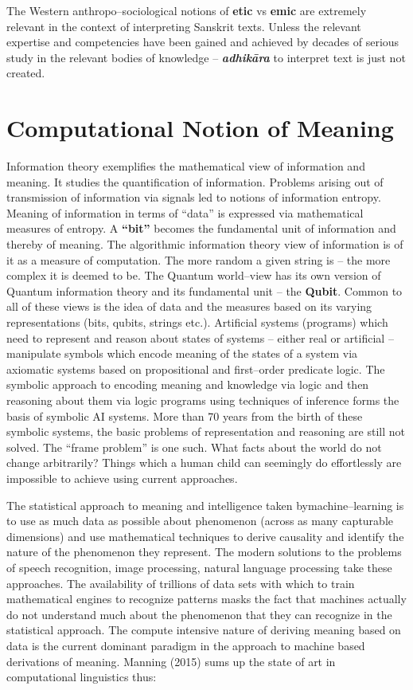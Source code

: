 The Western anthropo–sociological notions of \textbf{etic} vs \textbf{emic} are extremely relevant in the context of interpreting Sanskrit texts. Unless the relevant expertise and competencies have been gained and achieved by decades of serious study in the relevant bodies of knowledge – \textbf{\textit{adhikāra}} to interpret text is just not created.


\section*{Computational Notion of Meaning}

\vskip -6.5pt

Information theory exemplifies the mathematical view of information and meaning. It studies the quantification of information. Problems arising out of transmission of information via signals led to notions of information entropy. Meaning of information in terms of “data” is expressed via mathematical measures of entropy. A \textbf{“bit”} becomes the fundamental unit of information and thereby of meaning. The algorithmic information theory view of information is of it as a measure of computation. The more random a given string is – the more complex it is deemed to be. The Quantum world–view has its own version of Quantum information theory and its fundamental unit – the \textbf{Qubit}. Common to all of these views is the idea of data and the measures based on its varying representations (bits, qubits, strings etc.). Artificial systems (programs) which need to represent and reason about states of systems – either real or artificial – manipulate symbols which encode meaning of the states of a system via axiomatic systems based on propositional and first–order predicate logic. The symbolic approach to encoding meaning and knowledge via logic and then reasoning about them via logic programs using techniques of inference forms the basis of symbolic AI systems. More than 70 years from the birth of these symbolic systems, the basic problems of representation and reasoning are still not solved. The “frame problem” is one such. What facts about the world do not change arbitrarily? Things which a human child can seemingly do effortlessly are impossible to achieve using current approaches.

The statistical approach to meaning and intelligence taken by\break machine–learning is to use as much data as possible about phenomenon (across as many capturable dimensions) and use mathematical techniques to derive causality and identify the nature of the phenomenon they represent. The modern solutions to the problems of speech recognition, image processing, natural language processing take these approaches. The availability of trillions of data sets with which to train mathematical engines to recognize patterns masks the fact that machines actually do not understand much about the phenomenon that they can recognize in the statistical approach. The compute intensive nature of deriving meaning based on data is the current dominant paradigm in the approach to machine based derivations of meaning. Manning (2015) sums up the state of art in computational linguistics thus:


